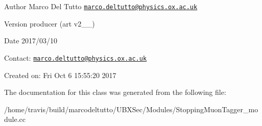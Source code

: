 \begin{DoxyAuthor}{Author}
Marco Del Tutto \href{mailto:marco.deltutto@physics.ox.ac.uk}{\tt marco.\-deltutto@physics.\-ox.\-ac.\-uk}
\end{DoxyAuthor}
\begin{DoxyVersion}{Version}
producer (art v2\-\_\-\_)
\end{DoxyVersion}
\begin{DoxyDate}{Date}
2017/03/10
\end{DoxyDate}
Contact\-: \href{mailto:marco.deltutto@physics.ox.ac.uk}{\tt marco.\-deltutto@physics.\-ox.\-ac.\-uk}

Created on\-: Fri Oct 6 15\-:55\-:20 2017 

The documentation for this class was generated from the following file\-:\begin{DoxyCompactItemize}
\item 
/home/travis/build/marcodeltutto/\-U\-B\-X\-Sec/\-Modules/Stopping\-Muon\-Tagger\-\_\-module.\-cc\end{DoxyCompactItemize}
